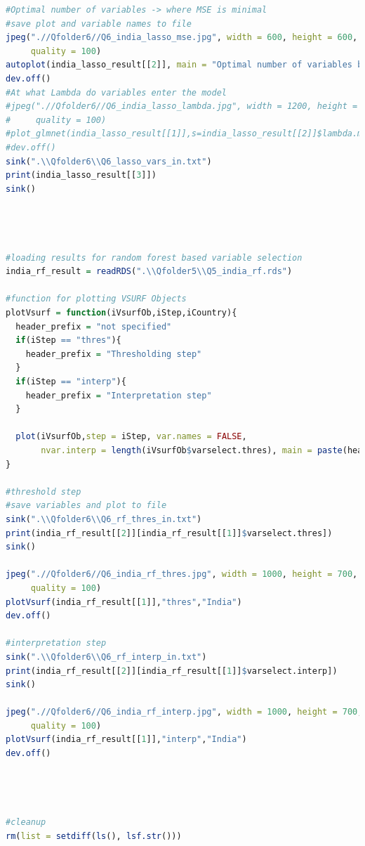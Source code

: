 \documentclass[11pt]{article}
\begin{document}
\begin{lstlisting}[language= R]
#Optimal number of variables -> where MSE is minimal
#save plot and variable names to file
jpeg(".//Qfolder6//Q6_india_lasso_mse.jpg", width = 600, height = 600, units = "px", pointsize = 20,
     quality = 100)
autoplot(india_lasso_result[[2]], main = "Optimal number of variables by MSE for India")
dev.off()
#At what Lambda do variables enter the model
#jpeg(".//Qfolder6//Q6_india_lasso_lambda.jpg", width = 1200, height = 1400, units = "px", pointsize = 20,
#     quality = 100)
#plot_glmnet(india_lasso_result[[1]],s=india_lasso_result[[2]]$lambda.min,col =india_lasso_result[[3]]$colors, label = TRUE )
#dev.off()
sink(".\\Qfolder6\\Q6_lasso_vars_in.txt")
print(india_lasso_result[[3]])
sink() 




#loading results for random forest based variable selection 
india_rf_result = readRDS(".\\Qfolder5\\Q5_india_rf.rds")

#function for plotting VSURF Objects
plotVsurf = function(iVsurfOb,iStep,iCountry){
  header_prefix = "not specified"
  if(iStep == "thres"){
    header_prefix = "Thresholding step"
  }
  if(iStep == "interp"){
    header_prefix = "Interpretation step"
  }
  
  plot(iVsurfOb,step = iStep, var.names = FALSE,
       nvar.interp = length(iVsurfOb$varselect.thres), main = paste(header_prefix,iCountry))
}

#threshold step 
#save variables and plot to file
sink(".\\Qfolder6\\Q6_rf_thres_in.txt")
print(india_rf_result[[2]][india_rf_result[[1]]$varselect.thres])
sink() 

jpeg(".//Qfolder6//Q6_india_rf_thres.jpg", width = 1000, height = 700, units = "px", pointsize = 20,
     quality = 100)
plotVsurf(india_rf_result[[1]],"thres","India")
dev.off()

#interpretation step 
sink(".\\Qfolder6\\Q6_rf_interp_in.txt")
print(india_rf_result[[2]][india_rf_result[[1]]$varselect.interp])
sink()

jpeg(".//Qfolder6//Q6_india_rf_interp.jpg", width = 1000, height = 700, units = "px", pointsize = 20,
     quality = 100)
plotVsurf(india_rf_result[[1]],"interp","India")
dev.off()




#cleanup
rm(list = setdiff(ls(), lsf.str()))
\end{lstlisting}
\end{document}
